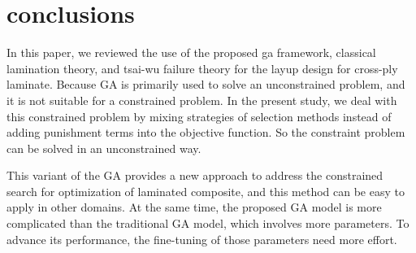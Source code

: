 \section{conclusions}
In this paper, we reviewed the use of the proposed ga framework, classical
lamination theory, and tsai-wu failure theory for the layup design for
cross-ply laminate. Because GA is primarily used to solve an unconstrained
problem, and it is not suitable for a constrained problem. In the present
study, we deal with this constrained problem by mixing strategies of selection
methods instead of adding punishment terms into the objective function. So the
constraint problem can be solved in an unconstrained way.

This variant of the GA provides a new approach to address the constrained
search for optimization of laminated composite, and this method can be easy
to apply in other domains. At the same time, the proposed GA model is more
complicated than the traditional GA model, which involves more parameters. To
advance its performance, the fine-tuning of those parameters need more effort. 
